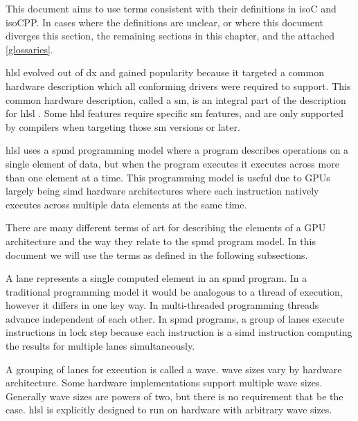 
\p This document aims to use terms consistent with their definitions in
\gls{isoC} and \gls{isoCPP}. In cases where the definitions are unclear, or
where this document diverges this section, the remaining sections in this
chapter, and the attached \ref{glossaries}.


\p \acrshort{hlsl} evolved out of \gls{dx} and gained popularity because it
targeted a common hardware description which all conforming drivers were
required to support. This common hardware description, called a \gls{sm}, is an
integral part of the description for \acrshort{hlsl} . Some \acrshort{hlsl}
features require specific \gls{sm} features, and are only supported by compilers
when targeting those \gls{sm} versions or later.


\p \acrshort{hlsl} uses a \acrfull{spmd} programming model where a program
describes operations on a single element of data, but when the program executes
it executes across more than one element at a time. This programming model is
useful due to GPUs largely being \acrfull{simd} hardware architectures where
each instruction natively executes across multiple data elements at the same
time.

\p There are many different terms of art for describing the elements of a GPU
architecture and the way they relate to the \acrshort{spmd} program model. In
this document we will use the terms as defined in the following subsections.


\p A \gls{lane} represents a single computed element in an \acrshort{spmd}
program. In a traditional programming model it would be analogous to a thread of
execution, however it differs in one key way. In multi-threaded programming
threads advance independent of each other. In \acrshort{spmd} programs, a group
of \gls{lane}s execute instructions in lock step because each instruction is a
\acrshort{simd} instruction computing the results for multiple \gls{lane}s
simultaneously.


\p A grouping of \gls{lane}s for execution is called a \gls{wave}. \gls{wave}
sizes vary by hardware architecture. Some hardware implementations support
multiple wave sizes. Generally wave sizes are powers of two, but there is no
requirement that be the case. \acrshort{hlsl} is explicitly designed to run on
hardware with arbitrary \gls{wave} sizes.

